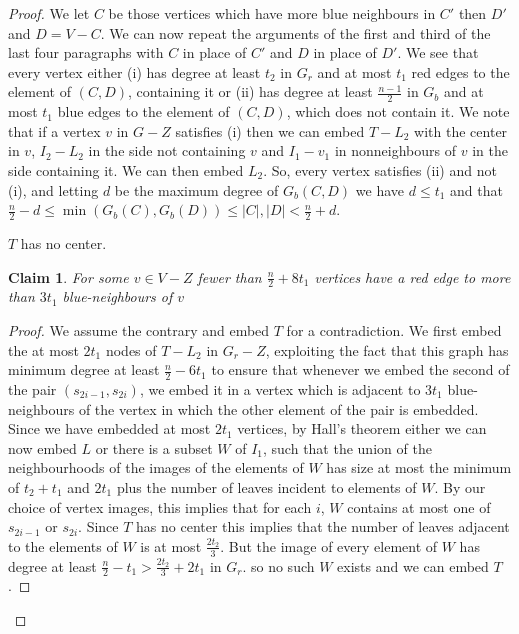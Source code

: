 \documentclass[10pt,a4paper]{amsart}
\newtheorem{claim}{Claim}
\begin{document}
\begin{proof}
We let $C$ be those vertices which have more blue neighbours in $C'$ then $D'$ and $D=V-C$. 
We can now repeat the arguments of the first and third of the last four paragraphs with $C$ in place of $C'$ and $D$ in place of $D'$. 
We see that every vertex either (i) has degree at least $t_2$ in $G_r$  and at most $t_1$ red edges to the element of $(C,D)$,
containing it or (ii) has degree at least $\frac{n-1}{2}$ in $G_b$  and at most $t_1$ blue  edges to the element of $(C,D)$,
which does not contain it. We note that if  a vertex $v$  in $G-Z$ satisfies  (i) then we can embed $T-L_2$ with the center in $v$, $I_2-L_2$ in the side not containing $v$ and $I_1-v_1$ in nonneighbours of $v$ in the side containing it. We can then embed $L_2$. So, every vertex satisfies (ii) and not (i), and  letting $d$ be the maximum degree of $G_b(C,D)$ we have  $d \le t_1$ and that  
$\frac{n}{2}-d \le \min(G_b(C),G_b(D)) \le |C|,|D| < \frac{n}{2}+d $.
\vskip0.2cm


 $T$ has no center.



\begin{claim}
 For some  $v\in V-Z$ fewer than  $\frac{n}{2}+8t_1$ vertices   have a red edge to  more than  
$3t_1$ blue-neighbours of $v$    
\end{claim}
\begin{proof}
    We assume the contrary and embed $T$ for a contradiction. We  first embed the at most $2t_1$ nodes of $T-L_2$ in $G_r-Z$, exploiting the fact that 
    this graph has minimum degree at least $\frac{n}{2}-6t_1$ to ensure  that 
whenever we embed  the second of the pair $(s_{2i-1},s_{2i})$, we embed it in a vertex which is 
adjacent to $3t_1$ blue-neighbours of 
the vertex in which the other element of the pair  is embedded. Since we have embedded at most $2t_1$ 
vertices, by  Hall's theorem  either we can now embed 
$L$ or there is a subset $W$ of $I_1$, such that the union of the neighbourhoods of 
the images of the elements of $W$ has size at most the minimum of $t_2+t_1$ and  $2t_1$ plus  the number of leaves 
incident to elements of $W$. By our choice of vertex images, this implies that for each $i$, 
$W$ contains at most one of $s_{2i-1}$ or $s_{2i}$. Since $T$ has no center this implies that 
the number of leaves adjacent to  the elements of $W$ is at most  $\frac{2t_2}{3}$. But the image of every 
element of $W$  has degree at least $\frac{n}{2}-t_1>\frac{2t_2}{3}+2t_1$ in $G_r$. so no such $W$ 
exists and we can embed $T$.
\end{proof}


\end{proof}
\end{document}
